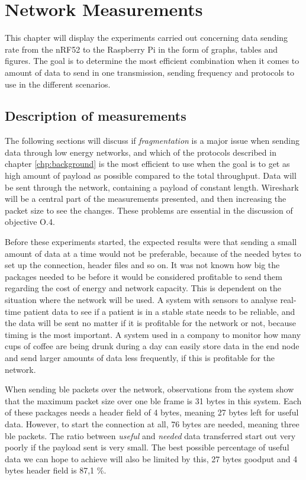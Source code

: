 \chapter{Network Measurements}
\label{chp:measurements2}


\noindent This chapter will display the experiments carried out concerning data sending rate from the \gls{nRF52} to the \gls{Raspberry Pi} in the form of graphs, tables and figures. The goal is to determine the most efficient combination when it comes to amount of data to send in one transmission, sending frequency and protocols to use in the different scenarios. 

\section{Description of measurements}

\noindent The following sections will discuss if \textit{fragmentation} is a major issue when sending data through low energy networks, and which of the protocols described in chapter \ref{chp:background}  is the most efficient to use when the goal is to get as high amount of \gls{payload} as possible compared to the total throughput. Data will be sent through the network, containing a payload of constant length. Wireshark will be a central part of the measurements presented, and then increasing the packet size to see the changes. These problems are essential in the discussion of objective O.4. 

\noindent Before these experiments started, the expected results were that sending a small amount of data at a time would not be preferable, because of the needed bytes to set up the connection, header files and so on. It was not known how big the packages needed to be before it would be considered profitable to send them regarding the cost of energy and network capacity. This is dependent on the situation where the network will be used. A system with sensors to analyse real-time patient data to see if a patient is in a stable state needs to be reliable, and the data will be sent no matter if it is profitable for the network or not, because timing is the most important. A system used in a company to monitor how many cups of coffee are being drunk during a day can easily store data in the end node and send larger amounts of data less frequently, if this is profitable for the network. 

\noindent When sending \gls{ble} packets over the network, observations from the system show that the maximum packet size over one \gls{ble} frame is 31 bytes in this system. Each of these packages needs a header field of 4 bytes, meaning 27 bytes left for useful data. However, to start the connection at all, 76 bytes are needed, meaning three \gls{ble} packets. The ratio between \textit{useful} and \textit{needed} data transferred start out very poorly if the payload sent is very small. The best possible percentage of useful data we can hope to achieve will also be limited by this, 27 bytes \gls{goodput} and 4 bytes header field is 87,1 \%. 

